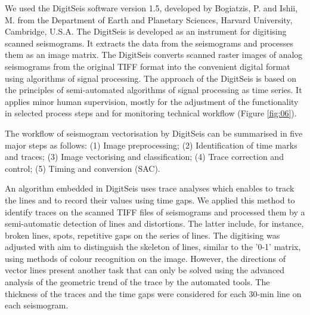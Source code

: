\documentclass[sensors,article,accept,moreauthors,pdftex]{Definitions/mdpi}
\begin{document}
We used the DigitSeis software version 1.5, developed by Bogiatzis, P. and Ishii, M. from the Department of Earth and Planetary Sciences, Harvard University, Cambridge, U.S.A. %
The DigitSeis is developed as {an }instrument for digitising {scanned }seismograms{. }It{ }extracts {the data }from the{ }seismograms {and processes them }as an image matrix. {The }DigitSeis converts scanned raster images of analog seismograms from {the }original TIFF format into the convenient digital format using {algorithms of }signal processing. The approach of {the }DigitSeis is based on the principles of semi-automated algorithms of signal processing as time series. It applies minor human supervision, mostly for {the }adjustment of {the }functionality in selected process {steps} and {for }monitoring technical workflow \linebreak (Figure \ref{fig:06}). 

The workflow of seismogram vectorisation by DigitSeis can be summarised in five major steps as follows: (1) Image preprocessing; (2) Identification of time marks and traces; (3) Image vectorising and classification; (4) Trace correction and control; (5) Timing and conversion (SAC).

An{ }algorithm {embedded in }DigitSeis uses trace analyses which enables to track the lines and {to }record their values using time gaps. We applied this method to identify traces on the scanned TIFF files of seismograms and {processed }them by {a semi-}automatic detection of lines and distortions{. The latter include, for instance, }broken lines, spots, repetitive gaps on the series of lines{. }The digitising was adjusted {with aim }to distinguish the {skeleton }of lines, similar to the '0-1' matrix, using methods of colour recognition on the image. However, the directions of vector lines present another task that can only be solved using {the }advanced analysis of the geometric trend of the trace by {the automated }tools. The thickness of the traces and {the }time gaps{ }were considered for each 30-min line on {each }seismogram{.} 
\end{document}
